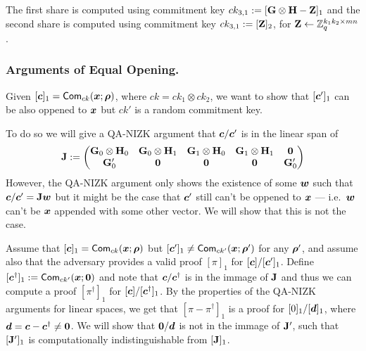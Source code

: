 The first share is computed using commitment key $ck_{3,1} := [\mathbf{{G}}\otimes\mathbf{{H}}-\mathbf{{Z}}]_1$ and the second share is computed using commitment key $ck_{3,1} := [\mathbf{{Z}}]_2$, for $\mathbf{{Z}}\gets\mathbb{Z}_q^{k_1k_2\times mn}$.

\subsubsection{Arguments of Equal Opening.} Given $[{\boldsymbol{c}}]_1=\mathsf{Com}_{ck}({\boldsymbol{x}};{\boldsymbol{\rho}})$, where $ck = ck_1\otimes ck_2$, we want to show that $[{\boldsymbol{c}}']_1$ can be also oppened to ${\boldsymbol{x}}$ but $ck'$ is a random commitment key.

To do so we will give a QA-NIZK argument that ${\boldsymbol{c}}/{\boldsymbol{c}}'$ is in the linear span of
$$
\mathbf{{J}}:=
\begin{pmatrix}
\mathbf{{G}}_0\otimes\mathbf{{H}}_0 & \mathbf{{G}}_0\otimes\mathbf{{H}}_1 & \mathbf{{G}}_1\otimes\mathbf{{H}}_0& \mathbf{{G}}_1\otimes\mathbf{{H}}_1 & \mathbf{{0}}\\
\mathbf{{G}}'_0 & \mathbf{{0}} & \mathbf{{0}} & \mathbf{{0}} & \mathbf{{G}}'_0 
\end{pmatrix}
$$
However, the QA-NIZK argument only shows the existence of some ${\boldsymbol{w}}$ such that ${\boldsymbol{c}}/{\boldsymbol{c}}' = \mathbf{{J}}{\boldsymbol{w}}$ but it might be the case that ${\boldsymbol{c}}'$ still can't be oppened to ${\boldsymbol{x}}$ --- i.e.~${\boldsymbol{w}}$ can't be ${\boldsymbol{x}}$ appended with some other vector. We will show that this is not the case.

Assume that $[{\boldsymbol{c}}]_1 = \mathsf{Com}_{ck}({\boldsymbol{x}};{\boldsymbol{\rho}})$ but $[{\boldsymbol{c}}']_1\neq \mathsf{Com}_{ck'}({\boldsymbol{x}};{\boldsymbol{\rho}}')$ for any ${\boldsymbol{\rho}}'$, and assume also that the adversary provides a valid proof $[\pi]_1$ for $[{\boldsymbol{c}}]/[{\boldsymbol{c}}']_1$. Define $[{\boldsymbol{c}}^\dag]_1:=\mathsf{Com}_{ck'}({\boldsymbol{x}};{\boldsymbol{0}})$ and note that ${\boldsymbol{c}}/{\boldsymbol{c}}^\dag$ is in the immage of $\mathbf{{J}}$ and thus we can compute a proof $[\pi^\dag]_1$ for $[{\boldsymbol{c}}]/[{\boldsymbol{c}}^\dag]_1$. By the properties of the QA-NIZK arguments for linear spaces, we get that $[\pi-\pi^\dag]_1$ is a proof for $[0]_1/[{\boldsymbol{d}}]_1$, where ${\boldsymbol{d}}={\boldsymbol{c}}-{\boldsymbol{c}}^\dag\neq {\boldsymbol{0}}$. We will show that ${\boldsymbol{0}}/ {\boldsymbol{d}}$ is not in the immage of $\mathbf{{J}}'$, such that $[\mathbf{{J}}']_1$ is computationally indistinguishable from $[\mathbf{{J}}]_1$.

